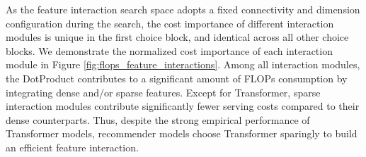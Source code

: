 As the feature interaction search space adopts a fixed connectivity and dimension configuration during the search, the cost importance of different interaction modules is unique in the first choice block, and identical across all other choice blocks.
We demonstrate the normalized cost importance of each interaction module in Figure \ref{fig:flops_feature_interactions}. 
Among all interaction modules, the DotProduct contributes to a significant amount of FLOPs consumption by integrating dense and/or sparse features. Except for Transformer, sparse interaction modules contribute significantly fewer serving costs compared to their dense counterparts.
Thus, despite the strong empirical performance of Transformer models, recommender models choose Transformer sparingly to build an efficient feature interaction.

